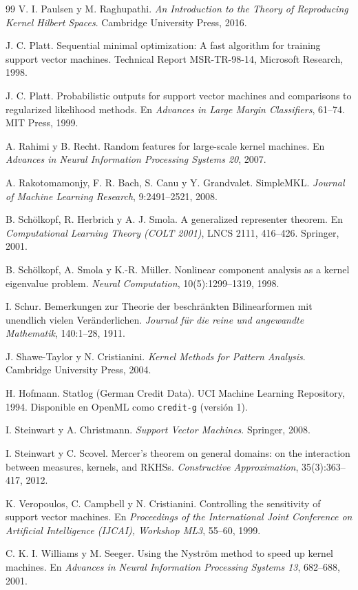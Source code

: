 \documentclass[11pt,a4paper]{article}
\newcommand{\code}[1]{\texttt{#1}}
\theoremstyle{plain}
\theoremstyle{definition}
\theoremstyle{remark}
\numberwithin{equation}{section}
\begin{document}
\begin{thebibliography}{99}
 V. I. Paulsen y M. Raghupathi. \emph{An Introduction to the Theory of
  Reproducing Kernel Hilbert Spaces}. Cambridge University Press, 2016.

 J. C. Platt. Sequential minimal optimization: A fast algorithm for
  training support vector machines. Technical Report MSR-TR-98-14, Microsoft Research, 1998.

 J. C. Platt. Probabilistic outputs for support vector machines and
  comparisons to regularized likelihood methods. En \emph{Advances in Large Margin
  Classifiers}, 61--74. MIT Press, 1999.

 A. Rahimi y B. Recht. Random features for large-scale kernel machines.
  En \emph{Advances in Neural Information Processing Systems 20}, 2007.

 A. Rakotomamonjy, F. R. Bach, S. Canu y Y. Grandvalet. SimpleMKL.
  \emph{Journal of Machine Learning Research}, 9:2491--2521, 2008.

 B. Schölkopf, R. Herbrich y A. J. Smola. A generalized representer
  theorem. En \emph{Computational Learning Theory (COLT 2001)}, LNCS 2111, 416--426.
  Springer, 2001.

 B. Schölkopf, A. Smola y K.-R. Müller. Nonlinear component analysis
  as a kernel eigenvalue problem. \emph{Neural Computation}, 10(5):1299--1319, 1998.

 I. Schur. Bemerkungen zur Theorie der beschränkten Bilinearformen mit
  unendlich vielen Veränderlichen. \emph{Journal für die reine und angewandte Mathematik},
  140:1--28, 1911.

 J. Shawe-Taylor y N. Cristianini. \emph{Kernel Methods for Pattern
  Analysis}. Cambridge University Press, 2004.

 H. Hofmann. Statlog (German Credit Data). UCI Machine Learning Repository,
  1994. Disponible en OpenML como \code{credit-g} (versión 1).

 I. Steinwart y A. Christmann. \emph{Support Vector Machines}.
  Springer, 2008.

 I. Steinwart y C. Scovel. Mercer's theorem on general domains:
  on the interaction between measures, kernels, and RKHSs. \emph{Constructive Approximation},
  35(3):363--417, 2012.

 K. Veropoulos, C. Campbell y N. Cristianini. Controlling the
  sensitivity of support vector machines. En \emph{Proceedings of the International Joint
  Conference on Artificial Intelligence (IJCAI), Workshop ML3}, 55--60, 1999.

 C. K. I. Williams y M. Seeger. Using the Nyström method to speed up
  kernel machines. En \emph{Advances in Neural Information Processing Systems 13}, 682--688,
  2001.

\end{thebibliography}
\end{document}
